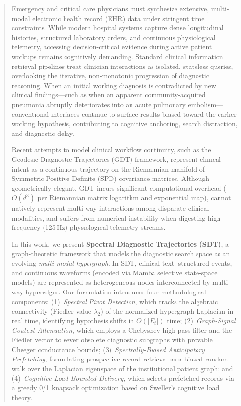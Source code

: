 \documentclass[10pt]{article}
\begin{document}
\begin{abstract}
\noindent
Emergency and critical care physicians must synthesize extensive, multi-modal electronic health record (EHR) data under stringent time constraints. While modern hospital systems capture dense longitudinal histories, structured laboratory orders, and continuous physiological telemetry, accessing decision-critical evidence during active patient workups remains cognitively demanding. Standard clinical information retrieval pipelines treat clinician interactions as isolated, stateless queries, overlooking the iterative, non-monotonic progression of diagnostic reasoning. When an initial working diagnosis is contradicted by new clinical findings---such as when an apparent community-acquired pneumonia abruptly deteriorates into an acute pulmonary embolism---conventional interfaces continue to surface results biased toward the earlier working hypothesis, contributing to cognitive anchoring, search distraction, and diagnostic delay.

\medskip
\noindent
Recent attempts to model clinical workflow continuity, such as the Geodesic Diagnostic Trajectories (GDT) framework, represent clinical intent as a continuous trajectory on the Riemannian manifold of Symmetric Positive Definite (SPD) covariance matrices. Although geometrically elegant, GDT incurs significant computational overhead ($O(d^3)$ per Riemannian matrix logarithm and exponential map), cannot natively represent multi-way interactions among disparate clinical modalities, and suffers from numerical instability when digesting high-frequency (125\,Hz) physiological telemetry streams.

\medskip
\noindent
In this work, we present \textbf{Spectral Diagnostic Trajectories (SDT)}, a graph-theoretic framework that models the diagnostic search space as an evolving \emph{multi-modal hypergraph}. In SDT, clinical text, structured events, and continuous waveforms (encoded via Mamba selective state-space models) are represented as heterogeneous nodes interconnected by multi-way hyperedges. Our formulation introduces four methodological components:
(1)~\emph{Spectral Pivot Detection}, which tracks the algebraic connectivity (Fiedler value $\lambda_2$) of the normalized hypergraph Laplacian in real time, identifying hypothesis shifts in $O(|E_t|)$ time;
(2)~\emph{Graph-Signal Context Attenuation}, which employs a Chebyshev high-pass filter and the Fiedler vector to sever obsolete diagnostic subgraphs with provable Cheeger conductance bounds;
(3)~\emph{Spectrally-Biased Anticipatory Prefetching}, formulating prospective record retrieval as a biased random walk over the Laplacian eigenspace of the institutional patient graph; and
(4)~\emph{Cognitive-Load-Bounded Delivery}, which selects prefetched records via a greedy 0/1 knapsack optimization based on Sweller's cognitive load theory.


\end{abstract}
\end{document}
